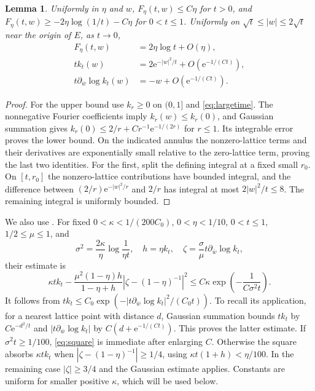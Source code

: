 \documentclass[11pt]{article}
\newtheorem{lemma}[theorem]{Lemma}
\theoremstyle{remark}
\begin{document}
\begin{lemma}\label{lem:values}
Uniformly in $\eta$ and $w$,
$F_\eta(t,w)\leq C\eta$ for $t>0$, and
$F_\eta(t,w)\geq-2\eta\log(1/t)-C\eta$ for $0<t\leq1$.
Uniformly on $\sqrt t\leq|w|\leq2\sqrt t$ near the origin of $E$, as $t\to0$,
\begin{align*}
 F_\eta(t,w)&=2\eta\log t+O(\eta),\\
 t k_t(w)&=2\mathrm e^{-|w|^2/t}+O(\mathrm e^{-1/(Ct)}),\\
 t\partial_{\bar w}\log k_t(w)&=-w+O(\mathrm e^{-1/(Ct)}).
\end{align*}
\end{lemma}
\begin{proof}
For the upper bound use $k_r\geq0$ on $(0,1]$ and \eqref{eq:largetime}.
The nonnegative Fourier coefficients imply $k_r(w)\leq k_r(0)$, and Gaussian
summation gives
$k_r(0)\leq2/r+C r^{-1}\mathrm e^{-1/(2r)}$ for $r\leq1$.
Its integrable error proves the lower bound.
On the indicated annulus the nonzero-lattice terms and their derivatives
are exponentially small relative to the zero-lattice term, proving the last
two identities. For the first, split the defining integral at a fixed small
$r_0$. On $[t,r_0]$ the nonzero-lattice contributions have bounded integral,
and the difference between $(2/r)\mathrm e^{-|w|^2/r}$ and $2/r$ has integral
at most $2|w|^2/t\leq8$. The remaining integral is uniformly bounded.
\end{proof}

We also use \cite[Lemmas 3.2--3.3]{XZ}. For fixed
$0<\kappa<1/(200C_0)$, $0<\eta<1/10$, $0<t\leq1$, $1/2\leq\mu\leq1$, and
\[
 \sigma^2=\frac{2\kappa}{\eta}\log\frac1{\eta t},\quad
 h=\eta k_t,\quad
 \zeta=\frac\sigma\mu t\partial_{\bar w}\log k_t,
\]
their estimate is
\begin{equation}\label{eq:square}
 \kappa tk_t-
 \frac{\mu^2(1-\eta)h}{1-\eta+h}
       |\zeta-(1-\eta)^{-1}|^2
 \leq C\kappa\exp\left(-\frac1{C\sigma^2t}\right).
\end{equation}
It follows from
$tk_t\leq C_0\exp(-|t\partial_{\bar w}\log k_t|^2/(C_0t))$.
To recall its application, for a nearest lattice point with distance $d$,
Gaussian summation bounds $tk_t$ by $C\mathrm e^{-d^2/t}$ and
$|t\partial_{\bar w}\log k_t|$ by $C(d+\mathrm e^{-1/(Ct)})$.
This proves the latter estimate. If $\sigma^2t\geq1/100$, \eqref{eq:square}
is immediate after enlarging $C$. Otherwise the square absorbs $\kappa tk_t$
when $|\zeta-(1-\eta)^{-1}|\geq1/4$, using
$\kappa t(1+h)<\eta/100$. In the remaining case $|\zeta|\geq3/4$ and the
Gaussian estimate applies. Constants are uniform for smaller positive
$\kappa$, which will be used below.
\end{document}
